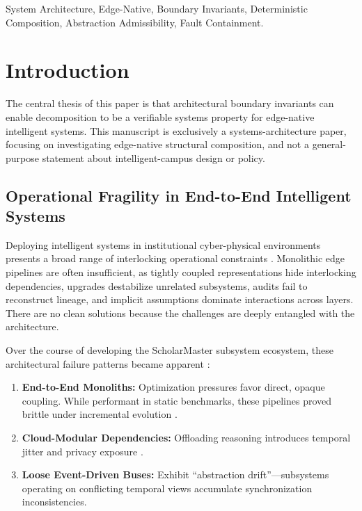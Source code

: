 \documentclass[conference]{IEEEtran}
\begin{document}
\begin{IEEEkeywords}
System Architecture, Edge-Native, Boundary Invariants, Deterministic Composition, Abstraction Admissibility, Fault Containment.
\end{IEEEkeywords}

\section{Introduction}

The central thesis of this paper is that architectural boundary invariants can enable decomposition to be a verifiable systems property for edge-native intelligent systems. This manuscript is exclusively a systems-architecture paper, focusing on investigating edge-native structural composition, and not a general-purpose statement about intelligent-campus design or policy.

\subsection{Operational Fragility in End-to-End Intelligent Systems}
Deploying intelligent systems in institutional cyber-physical environments \cite{b1, b5, b14} presents a broad range of interlocking operational constraints \cite{b6}. Monolithic edge pipelines are often insufficient, as tightly coupled representations hide interlocking dependencies, upgrades destabilize unrelated subsystems, audits fail to reconstruct lineage, and implicit assumptions dominate interactions across layers. There are no clean solutions because the challenges are deeply entangled with the architecture.

Over the course of developing the ScholarMaster subsystem ecosystem, these architectural failure patterns became apparent \cite{b2, b13, b16}:
\begin{enumerate}
    \item \textbf{End-to-End Monoliths:} Optimization pressures favor direct, opaque coupling. While performant in static benchmarks, these pipelines proved brittle under incremental evolution \cite{b17}.
    \item \textbf{Cloud-Modular Dependencies:} Offloading reasoning introduces temporal jitter and privacy exposure \cite{b3, b18}.
    \item \textbf{Loose Event-Driven Buses:} Exhibit ``abstraction drift''---subsystems operating on conflicting temporal views accumulate synchronization inconsistencies.
\end{enumerate}
\end{document}
